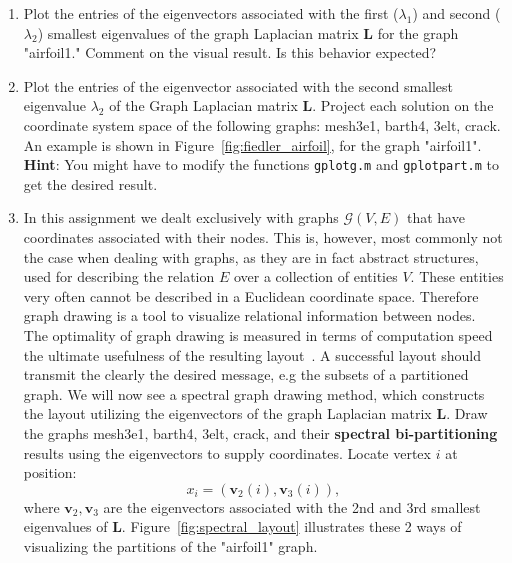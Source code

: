 \documentclass[unicode,11pt,a4paper,oneside,numbers=endperiod,openany]{scrartcl}
\begin{document}
\begin{enumerate}
    \item Plot the entries of the eigenvectors associated with the first ($\lambda_1$) and second ($\lambda_2$)  smallest eigenvalues of the graph Laplacian matrix $\mathbf{L}$ for the graph "airfoil1." Comment on the visual result. Is this behavior expected?
    \item Plot the entries of the eigenvector associated with the second smallest eigenvalue $\lambda_2$ of the Graph Laplacian matrix $\mathbf{L}$. Project each solution on the coordinate system space of the following graphs: mesh3e1, barth4, 3elt, crack. An example is shown in Figure~\ref{fig:fiedler_airfoil}, for the graph "airfoil1". \newline
    \textbf{Hint}: You might have to modify the functions \texttt{gplotg.m} and \texttt{gplotpart.m} to get the desired result.
    \item In this assignment we dealt exclusively with graphs $\mathcal{G}(V,E)$ that have coordinates associated with their nodes. This is, however, most commonly not the case when dealing with graphs, as they are in fact abstract structures, used for describing the relation $E$ over a collection of entities $V$. These entities very often cannot be described in a Euclidean coordinate space. Therefore graph drawing is a tool to visualize relational information between nodes. The optimality of graph drawing is measured in terms of computation speed the ultimate usefulness of the resulting layout~\cite{Koren05}. A successful layout should transmit the clearly the desired message, e.g the subsets of a partitioned graph.
    We will now see a spectral graph drawing method, which constructs the layout utilizing the eigenvectors of the graph Laplacian matrix $\mathbf{L}$. Draw the graphs mesh3e1, barth4, 3elt, crack, and their \textbf{spectral bi-partitioning} results using the eigenvectors to supply coordinates. Locate vertex $i$ at position:
    \begin{equation*}
        x_i = \left( \mathbf{v}_2(i), \mathbf{v}_3(i) 
        \right),
    \end{equation*}
    where $\mathbf{v}_2, \mathbf{v}_3$ are the eigenvectors associated with the 2nd and 3rd smallest eigenvalues of $\mathbf{L}$. Figure~\ref{fig:spectral_layout} illustrates these 2 ways of visualizing the partitions of the  "airfoil1" graph.
\end{enumerate}
\end{document}
